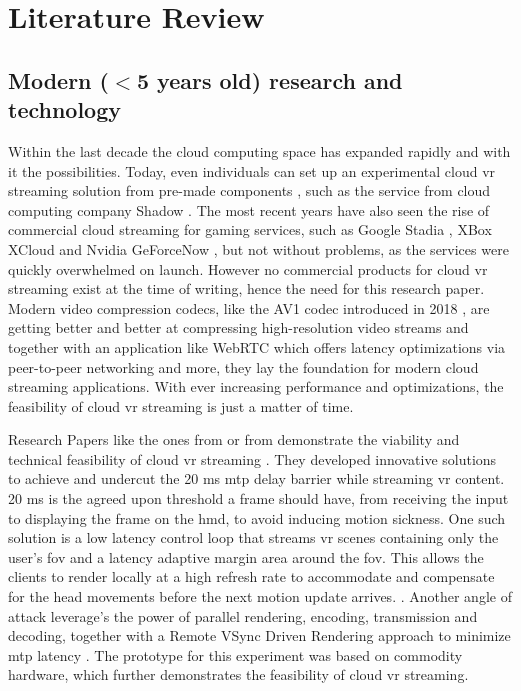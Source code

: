 \section{Literature Review}
\subsection{Modern ($<$5 years old) research and technology}

Within the last decade the cloud computing space has expanded rapidly and with it the possibilities. Today, even individuals can set up an experimental cloud \acrfull{vr} streaming solution from pre-made components \parencite{tayoexe}, such as the service from cloud computing company Shadow \parencite{shadow}. The most recent years have also seen the rise of commercial cloud streaming for gaming services, such as Google Stadia \parencite{stadia}, XBox XCloud \parencite{xcloud} and Nvidia GeForceNow \parencite{geforcenow}, but not without problems, as the services were quickly overwhelmed on launch. However no commercial products for cloud \acrshort{vr} streaming exist at the time of writing, hence the need for this research paper. Modern video compression codecs, like the AV1 codec introduced in 2018 \parencite{av1}, are getting better and better at compressing high-resolution video streams and together with an application like WebRTC \parencite{webRTC} which offers latency optimizations via peer-to-peer networking and more, they lay the foundation for modern cloud streaming applications. With ever increasing performance and optimizations, the feasibility of cloud \acrshort{vr} streaming is just a matter of time.

Research Papers like the ones from \cite{cutcord} or from \cite{mvr} demonstrate the viability and technical feasibility of cloud \acrshort{vr} streaming . They developed innovative solutions to achieve and undercut the 20 \acrfull{ms}  \acrfull{mtp} delay barrier while streaming \acrshort{vr} content. 20 \acrshort{ms} is the agreed upon threshold a frame should have, from receiving the input to displaying the frame on the \acrfull{hmd}, to avoid inducing motion sickness. One such solution is a low latency control loop that streams \acrshort{vr} scenes containing only the user’s \acrfull{fov} and a latency adaptive margin area around the \acrshort{fov}. This allows the clients to render locally at a high refresh rate to accommodate and compensate for the head movements before the next motion update arrives. \parencite{mvr}. Another angle of attack  leverage's the power of parallel rendering, encoding, transmission and decoding, together with a Remote VSync Driven Rendering approach to minimize \acrshort{mtp} latency \parencite{cutcord}. The prototype for this experiment was based on commodity hardware, which further demonstrates the feasibility of cloud \acrshort{vr} streaming.


